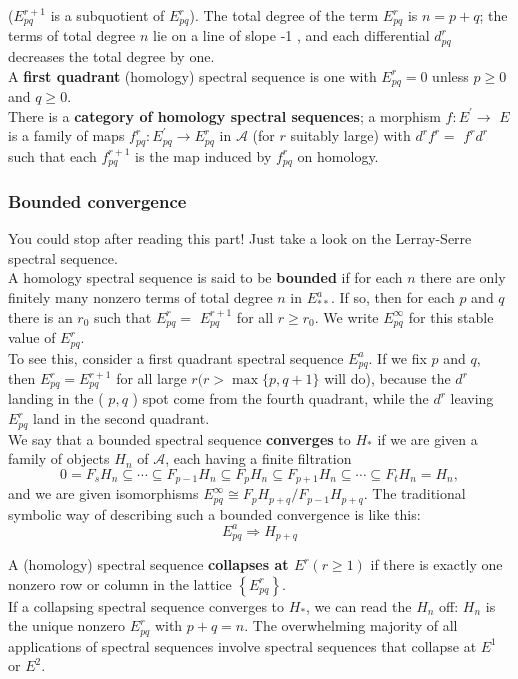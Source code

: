 ($E_{p q}^{r+1}$ is a subquotient of $E_{p q}^r$). The total degree of the term $E_{p q}^r$ is $n=p+q$; the terms of total degree $n$ lie on a line of slope -1 , and each differential $d_{p q}^r$ decreases the total degree by one.\\
A \textbf{first quadrant} (homology) spectral sequence is one with $E_{p q}^r=0$ unless $p \geq 0$ and $q \geq 0$.\\

There is a \textbf{category of homology spectral sequences}; a morphism $f: E^{\prime} \rightarrow$ $E$ is a family of maps $f_{p q}^r: E_{p q}^{\prime} \rightarrow E_{p q}^r$ in $\mathcal{A}$ (for $r$ suitably large) with $d^r f^r=$ $f^r d^r$ such that each $f_{p q}^{r+1}$ is the map induced by $f_{p q}^r$ on homology.

\subsubsection{Bounded convergence}
You could stop after reading this part! Just take a look on the Lerray-Serre spectral sequence.\\

A homology spectral sequence is said to be \textbf{bounded} if for each $n$ there are only finitely many nonzero terms of total degree $n$ in $E_{* *}^a$. If so, then for each $p$ and $q$ there is an $r_0$ such that $E_{p q}^r=$ $E_{p q}^{r+1}$ for all $r \geq r_0$. We write $E_{p q}^{\infty}$ for this stable value of $E_{p q}^r$.\\
To see this, consider a first quadrant spectral sequence $E^a _{pq}$. If we fix $p$ and $q$, then $E_{p q}^r=E_{p q}^{r+1}$ for all large $r(r>\max \{p, q+1\}$ will do), because the $d^r$ landing in the ( $p, q$ ) spot come from the fourth quadrant, while the $d^r$ leaving $E_{p q}^r$ land in the second quadrant.\\ 

We say that a bounded spectral sequence \textbf{converges} to $H_*$ if we are given a family of objects $H_n$ of $\mathcal{A}$, each having a finite filtration
$$
0=F_s H_n \subseteq \cdots \subseteq F_{p-1} H_n \subseteq F_p H_n \subseteq F_{p+1} H_n \subseteq \cdots \subseteq F_t H_n=H_n,
$$
and we are given isomorphisms $E_{p q}^{\infty} \cong F_p H_{p+q} / F_{p-1} H_{p+q}$. The traditional symbolic way of describing such a bounded convergence is like this:
$$
E_{p q}^a \Rightarrow H_{p+q}
$$

A (homology) spectral sequence \textbf{collapses at $E^r(r \geq 1)$ } if there is exactly one nonzero row or column in the lattice $\left\{E_{p q}^r\right\}$.\\
If a collapsing spectral sequence converges to $H_*$, we can read the $H_n$ off: $H_n$ is the unique nonzero $E_{p q}^r$ with $p+q=n$. The overwhelming majority of all applications of spectral sequences involve spectral sequences that collapse at $E^1$ or $E^2$.\\



